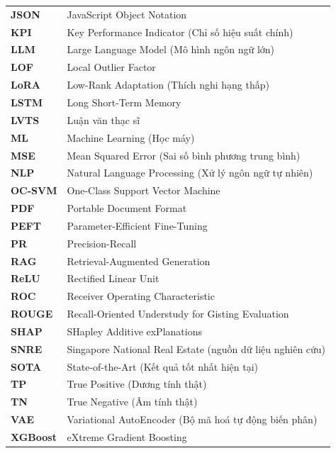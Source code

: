 \begin{longtable}{@{}>{\bfseries}p{3cm}p{\dimexpr\textwidth-3cm-2\tabcolsep}@{}}
JSON  & JavaScript Object Notation \\[4pt]
KPI   & Key Performance Indicator (Chỉ số hiệu suất chính) \\[4pt]
LLM   & Large Language Model (Mô hình ngôn ngữ lớn) \\[4pt]
LOF   & Local Outlier Factor \\[4pt]
LoRA  & Low-Rank Adaptation (Thích nghi hạng thấp) \\[4pt]
LSTM  & Long Short-Term Memory \\[4pt]
LVTS  & Luận văn thạc sĩ \\[4pt]
ML    & Machine Learning (Học máy) \\[4pt]
MSE   & Mean Squared Error (Sai số bình phương trung bình) \\[4pt]
NLP   & Natural Language Processing (Xử lý ngôn ngữ tự nhiên) \\[4pt]
OC-SVM & One-Class Support Vector Machine \\[4pt]
PDF   & Portable Document Format \\[4pt]
PEFT  & Parameter-Efficient Fine-Tuning \\[4pt]
PR    & Precision-Recall \\[4pt]
RAG   & Retrieval-Augmented Generation \\[4pt]
ReLU  & Rectified Linear Unit \\[4pt]
ROC   & Receiver Operating Characteristic \\[4pt]
ROUGE & Recall-Oriented Understudy for Gisting Evaluation \\[4pt]
SHAP  & SHapley Additive exPlanations \\[4pt]
SNRE  & Singapore National Real Estate (nguồn dữ liệu nghiên cứu) \\[4pt]
SOTA  & State-of-the-Art (Kết quả tốt nhất hiện tại) \\[4pt]
TP    & True Positive (Dương tính thật) \\[4pt]
TN    & True Negative (Âm tính thật) \\[4pt]
VAE   & Variational AutoEncoder (Bộ mã hoá tự động biến phân) \\[4pt]
XGBoost & eXtreme Gradient Boosting \\[4pt]
\end{longtable}

\setlength{\parskip}{10pt}
